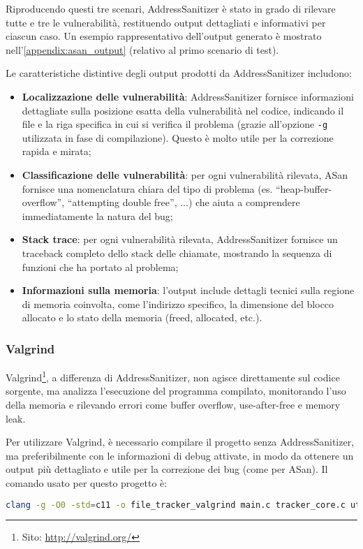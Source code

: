 Riproducendo questi tre scenari, AddressSanitizer è stato in grado di rilevare tutte
e tre le vulnerabilità, restituendo output dettagliati e informativi per ciascun
caso. Un esempio rappresentativo dell'output generato è mostrato nell'\autoref{appendix:asan_output}
(relativo al primo scenario di test).

Le caratteristiche distintive degli output prodotti da AddressSanitizer includono:
\begin{itemize}
  \item \textbf{Localizzazione delle vulnerabilità}: AddressSanitizer fornisce informazioni
    dettagliate sulla posizione esatta della vulnerabilità nel codice, indicando
    il file e la riga specifica in cui si verifica il problema (grazie all'opzione
    \texttt{-g} utilizzata in fase di compilazione). Questo è molto utile per la
    correzione rapida e mirata;

  \item \textbf{Classificazione delle vulnerabilità}: per ogni vulnerabilità rilevata,
    ASan fornisce una nomenclatura chiara del tipo di problema (es. ``heap-buffer-overflow'',
    ``attempting double free'', ...) che aiuta a comprendere immediatamente la natura
    del bug;

  \item \textbf{Stack trace}: per ogni vulnerabilità rilevata, AddressSanitizer
    fornisce un traceback completo dello stack delle chiamate, mostrando la sequenza
    di funzioni che ha portato al problema;

  \item \textbf{Informazioni sulla memoria}: l'output include dettagli tecnici sulla
    regione di memoria coinvolta, come l'indirizzo specifico, la dimensione del blocco
    allocato e lo stato della memoria (freed, allocated, etc.).
\end{itemize}

\subsubsection*{Valgrind}
Valgrind\footnote{Sito: \url{http://valgrind.org/}}, a differenza di AddressSanitizer,
non agisce direttamente sul codice sorgente, ma analizza l'esecuzione del programma
compilato, monitorando l'uso della memoria e rilevando errori come buffer
overflow, use-after-free e memory leak.

Per utilizzare Valgrind, è necessario compilare il progetto senza
AddressSanitizer, ma preferibilmente con le informazioni di debug attivate, in
modo da ottenere un output più dettagliato e utile per la correzione dei bug (come
per ASan). Il comando usato per questo progetto è:
\begin{lstlisting}[language=bash, numbers=none]
clang -g -O0 -std=c11 -o file_tracker_valgrind main.c tracker_core.c utils.c
\end{lstlisting}

